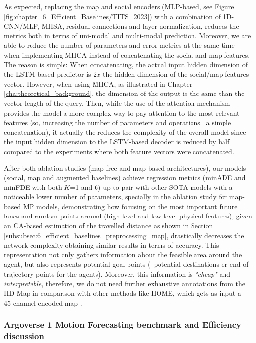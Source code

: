 As expected, replacing the map and social encoders (\ac{MLP}-based, see Figure \ref{fig:chapter_6_Efficient_Baselines/TITS_2023}) with a combination of 1D-\ac{CNN}/\ac{MLP}, \ac{MHSA}, residual connections and layer normalization, reduces the metrics both in terms of uni-modal and multi-modal prediction. Moreover, we are able to reduce the number of parameters and error metrics at the same time when implementing \ac{MHCA} instead of concatenating the social and map features. The reason is simple: When concatenating, the actual input hidden dimension of the \ac{LSTM}-based predictor is $2x$ the hidden dimension of the social/map features vector. However, when using \ac{MHCA}, as illustrated in Chapter \ref{cha:theoretical_background}, the dimension of the output is the same than the vector length of the query. Then, while the use of the attention mechanism provides the model a more complex way to pay attention to the most relevant features (so, increasing the number of parameters and operations \wrt \ a simple concatenation), it actually the reduces the complexity of the overall model since the input hidden dimension to the \ac{LSTM}-based decoder is reduced by half compared to the experiments where both feature vectors were concatenated.

After both ablation studies (map-free and map-based architectures), our models (social, map and augmented baselines) achieve regression metrics (\ac{minADE} and \ac{minFDE} with both $K$=1 and 6) up-to-pair with other \ac{SOTA} models with a noticeable lower number of parameters, specially in the ablation study for map-based \ac{MP} models, demonstrating how focusing on the most important future lanes and random points around (high-level and low-level physical features), given an \ac{CA}-based estimation of the travelled distance as shown in Section \ref{subsubsec:6_efficient_baselines_preprocessing_map}, drastically decreases the network complexity obtaining similar results in terms of accuracy. This representation not only gathers information about the feasible area around the agent, but also represents potential goal points \cite{dendorfer2020goal} (\ie \ potential destinations or end-of-trajectory points for the agents). Moreover, this information is \textit{"cheap"} and \textit{interpretable}, therefore, we do not need further exhaustive annotations from the HD Map in comparison with other methods like HOME, which gets as input a 45-channel encoded map \cite{gilles2021home}.

\subsubsection{Argoverse 1 Motion Forecasting benchmark and Efficiency discussion}
\label{subsubsec:6_efficient_baselines_argo1_leaderboard}

